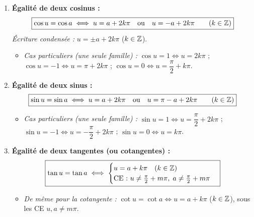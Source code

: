 \begin{theoreme}
\begin{enumerate}
    \item \textbf{Égalité de deux cosinus :}
    \[
        \boxed{\cos u = \cos a \iff u = a + 2k\pi \quad \text{ou} \quad u = -a + 2k\pi \qquad (k \in \mathbb{Z})}
    \]
    \emph{Écriture condensée :} $u = \pm a + 2k\pi$ ($k \in \mathbb{Z}$).
    \begin{itemize}
        \item \emph{Cas particuliers (une seule famille) :} $\cos u = 1 \iff u = 2k\pi$ ; \quad $\cos u = -1 \iff u = \pi + 2k\pi$ ; \quad $\cos u = 0 \iff u = \dfrac{\pi}{2} + k\pi$.
    \end{itemize}

    \item \textbf{Égalité de deux sinus :}
    \[
        \boxed{\sin u = \sin a \iff u = a + 2k\pi \quad \text{ou} \quad u = \pi - a + 2k\pi \qquad (k \in \mathbb{Z})}
    \]
    \begin{itemize}
        \item \emph{Cas particuliers (une seule famille) :} $\sin u = 1 \iff u = \dfrac{\pi}{2} + 2k\pi$ ; \quad $\sin u = -1 \iff u = -\dfrac{\pi}{2} + 2k\pi$ ; \quad $\sin u = 0 \iff u = k\pi$.
    \end{itemize}

    \item \textbf{Égalité de deux tangentes (ou cotangentes) :}
    \[
        \boxed{\tan u = \tan a \iff \begin{cases} u = a + k\pi \quad (k \in \mathbb{Z}) \\ \text{CE : } u \neq \frac{\pi}{2} + m\pi,\; a \neq \frac{\pi}{2} + m\pi \end{cases}}
    \]
    \begin{itemize}
        \item \emph{De même pour la cotangente :} $\cot u = \cot a \iff u = a + k\pi$ ($k \in \mathbb{Z}$), sous les CE $u, a \neq m\pi$.
    \end{itemize}
\end{enumerate}
\end{theoreme}

